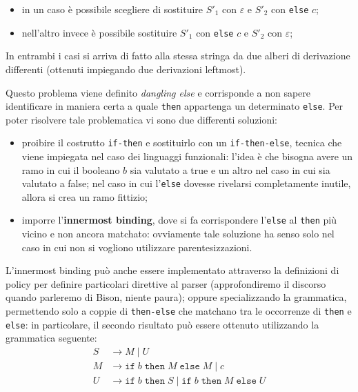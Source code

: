 \documentclass[class=book, crop=false, oneside, 12pt]{standalone}
\begin{document}
\begin{itemize}
	\item in un caso è possibile scegliere di sostituire \({S'}_1\) con \(\varepsilon\) e \({S'}_2\) con \texttt{else} \(c\);
	\item nell'altro invece è possibile sostituire \({S'}_1\) con \texttt{else} \(c\) e \({S'}_2\) con \(\varepsilon\);
\end{itemize}

In entrambi i casi si arriva di fatto alla stessa stringa da due alberi di derivazione differenti (ottenuti impiegando due derivazioni leftmost).

Questo problema viene definito \emph{dangling else} e corrisponde a non sapere identificare in maniera certa a quale \texttt{then} appartenga un determinato \texttt{else}. Per poter risolvere tale problematica vi sono due differenti soluzioni:
\begin{itemize}
    \item proibire il costrutto \texttt{if-then} e sostituirlo con un \texttt{if-then-else}, tecnica che viene impiegata nel caso dei linguaggi funzionali: l'idea è che bisogna avere un ramo in cui il booleano \(b\) sia valutato a true e un altro nel caso in cui sia valutato a false; nel caso in cui l'\texttt{else} dovesse rivelarsi completamente inutile, allora si crea un ramo fittizio;
    \item imporre l'\textbf{innermost binding}, dove si fa corrispondere l'\texttt{else} al \texttt{then} più vicino e non ancora matchato: ovviamente tale soluzione ha senso solo nel caso in cui non si vogliono utilizzare parentesizzazioni.
\end{itemize}
L'innermost binding può anche essere implementato attraverso la definizioni di policy per definire particolari direttive al parser (approfondiremo il discorso quando parleremo di Bison, niente paura); oppure specializzando la grammatica, permettendo solo a coppie di \texttt{then-else} che matchano tra le occorrenze di \texttt{then} e \texttt{else}: in particolare, il secondo risultato può essere ottenuto utilizzando la grammatica seguente:
\begin{align*}
    S &\rightarrow M \mid U \\
    M &\rightarrow \texttt{if} \; b \; \texttt{then} \; M \; \texttt{else} \; M \mid c \\
    U &\rightarrow \texttt{if} \; b \; \texttt{then} \; S \mid \texttt{if} \; b \; \texttt{then} \; M \; \texttt{else} \; U
\end{align*}
\end{document}

